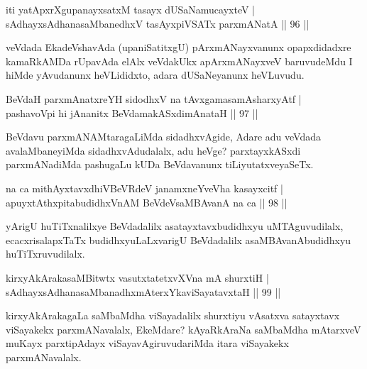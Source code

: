 \begin{shl}
iti yatApxrXgupanayxsatxM tasayx dUSaNamucayxteV  | \\
sAdhayxsAdhanasaMbanedhxV tasAyxpiVSATx parxmANatA \hfill||  96 ||  
\end{shl}

\begin{artha}
veVdada EkadeVshavAda (upaniSatitxgU) pArxmANayxvanunx opapxdidadxre kamaRkAMDa rUpavAda elAlx veVdakUkx apArxmANayxveV baruvudeMdu I hiMde yAvudanunx heVLididxto, adara dUSaNeyanunx heVLuvudu. 
\end{artha}


\begin{shl}
BeVdaH parxmAnatxreYH sidodhxV na tAvxgamasamAsharxyAtf  | \\
pashavoV\s pi hi jAnanitx BeVdamakASxdimAnataH \hfill||  97 || 
\end{shl}

\begin{artha}
BeVdavu parxmANAMtaragaLiMda sidadhxvAgide, Adare adu veVdada avalaMbaneyiMda sidadhxvAdudalalx, adu heVge? parxtayxkASxdi parxmANadiMda pashugaLu kUDa BeVdavanunx tiLiyutatxveyaSeTx.
\end{artha}


\begin{shl}
na ca mithAyxtavxdhiVBeVRdeV janamxneYveVha kasayxcitf  | \\
apuyxtAthxpitabudidhxVnAM BeVdeV\s saMBAvanA na ca \hfill||  98 ||  
\end{shl}

\begin{artha}
yArigU huTiTxnalilxye BeVdadalilx asatayxtavxbudidhxyu uMTAguvudilalx, ecacxrisalapxTaTx budidhxyuLaLxvarigU BeVdadalilx asaMBAvanAbudidhxyu huTiTxruvudilalx.
\end{artha}

\begin{shl}
kirxyAkArakasaMBitwtx vasutxtatetxvXVna mA shurxtiH  | \\
sAdhayxsAdhanasaMbanadhxmAterxYkaviSayatavxtaH \hfill||  99 ||  
\end{shl}

\begin{artha}
kirxyAkArakagaLa saMbaMdha viSayadalilx shurxtiyu vAsatxva satayxtavx viSayakekx parxmANavalalx, EkeMdare? kAyaRkAraNa saMbaMdha mAtarxveV muKayx parxtipAdayx viSayavAgiruvudariMda itara viSayakekx parxmANavalalx.
\end{artha}

